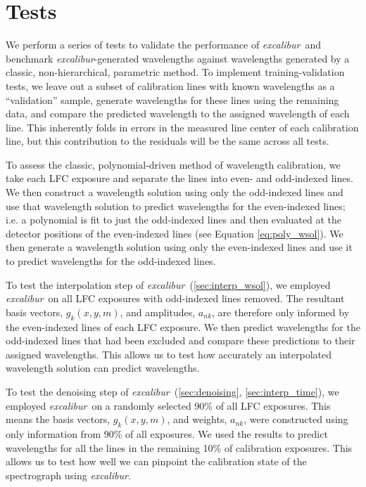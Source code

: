 \documentclass[twocolumn,table,xcolor,trackchanges]{aastex63}
\newcommand{\project}[1]{\textsl{#1}}
\newcommand{\name}{\project{excalibur}}
\begin{document}
\section{Tests}\label{sec:tests}
We perform a series of tests to validate the performance of \name\ and benchmark \name -generated wavelengths against wavelengths generated by a classic, non-hierarchical, parametric method.  To implement training-validation tests, we leave out a subset of calibration lines with known wavelengths as a ``validation'' sample, generate wavelengths for these lines using the remaining data, and compare the predicted wavelength to the assigned wavelength of each line.  This inherently folds in errors in the measured line center of each calibration line, but this contribution to the residuals will be the same across all tests.

To assess the classic, polynomial-driven method of wavelength calibration, we take each LFC exposure and separate the lines into even- and odd-indexed lines.  We then construct a wavelength solution using only the odd-indexed lines and use  that wavelength solution to predict wavelengths for the even-indexed lines; i.e. a polynomial is fit to just the odd-indexed lines and then evaluated at the detector positions of the even-indexed lines (see Equation \ref{eq:poly_wsol}).  We then generate a wavelength solution using only the even-indexed lines and use it to predict wavelengths for the odd-indexed lines.

To test the interpolation step of \name\ (\textsection \ref{sec:interp_wsol}), we employed \name\ on all LFC exposures with odd-indexed lines removed.  The resultant basis vectors, $g_k(x,y,m)$,  and amplitudes, $a_{nk}$, are therefore only informed by the even-indexed lines of each LFC exposure.  We then predict wavelengths for the odd-indexed lines that had been excluded and compare these predictions to their assigned wavelengths.  This allows us to test how accurately an interpolated wavelength solution can predict wavelengths.

To test the denoising step of \name\ (\textsection \ref{sec:denoising}, \textsection\ref{sec:interp_time}), we employed \name\ on a randomly selected 90\% of all LFC exposures.  This means the basis vectors, $g_k(x,y,m)$,  and weights, $a_{nk}$, were constructed using only information from 90\% of all exposures.  We used the results to predict wavelengths for all the lines in the remaining 10\% of calibration exposures.  This allows us to test how well we can pinpoint the calibration state of the spectrograph using \name.
\end{document}
